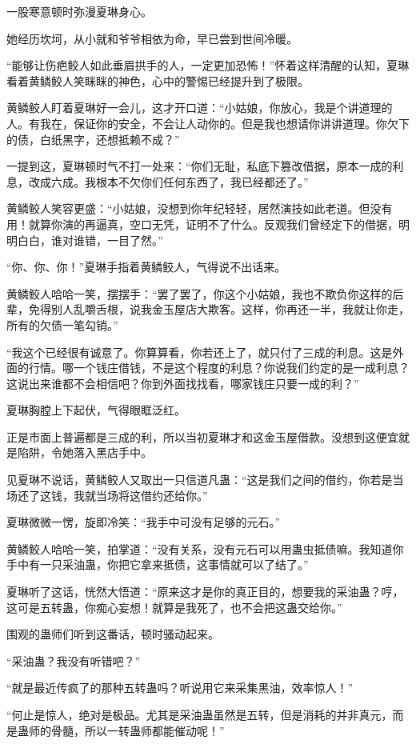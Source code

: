 \begin{this_body}
一股寒意顿时弥漫夏琳身心。

她经历坎坷，从小就和爷爷相依为命，早已尝到世间冷暖。

“能够让伤疤鲛人如此垂眉拱手的人，一定更加恐怖！”怀着这样清醒的认知，夏琳看着黄鳞鲛人笑眯眯的神色，心中的警惕已经提升到了极限。

黄鳞鲛人盯着夏琳好一会儿，这才开口道：“小姑娘，你放心，我是个讲道理的人。有我在，保证你的安全，不会让人动你的。但是我也想请你讲讲道理。你欠下的债，白纸黑字，还想抵赖不成？”

一提到这，夏琳顿时气不打一处来：“你们无耻，私底下篡改借据，原本一成的利息，改成六成。我根本不欠你们任何东西了，我已经都还了。”

黄鳞鲛人笑容更盛：“小姑娘，没想到你年纪轻轻，居然演技如此老道。但没有用！就算你演的再逼真，空口无凭，证明不了什么。反观我们曾经定下的借据，明明白白，谁对谁错，一目了然。”

“你、你、你！”夏琳手指着黄鳞鲛人，气得说不出话来。

黄鳞鲛人哈哈一笑，摆摆手：“罢了罢了，你这个小姑娘，我也不欺负你这样的后辈，免得别人乱嚼舌根，说我金玉屋店大欺客。这样，你再还一半，我就让你走，所有的欠债一笔勾销。”

“我这个已经很有诚意了。你算算看，你若还上了，就只付了三成的利息。这是外面的行情。哪一个钱庄借钱，不是这个程度的利息？你说我们约定的是一成利息？这说出来谁都不会相信吧？你到外面找找看，哪家钱庄只要一成的利？”

夏琳胸膛上下起伏，气得眼眶泛红。

正是市面上普遍都是三成的利，所以当初夏琳才和这金玉屋借款。没想到这便宜就是陷阱，令她落入黑店手中。

见夏琳不说话，黄鳞鲛人又取出一只信道凡蛊：“这是我们之间的借约，你若是当场还了这钱，我就当场将这借约还给你。”

夏琳微微一愣，旋即冷笑：“我手中可没有足够的元石。”

黄鳞鲛人哈哈一笑，拍掌道：“没有关系，没有元石可以用蛊虫抵债嘛。我知道你手中有一只采油蛊，你把它拿来抵债，这事情就可以了结了。”

夏琳听了这话，恍然大悟道：“原来这才是你的真正目的，想要我的采油蛊？哼，这可是五转蛊，你痴心妄想！就算是我死了，也不会把这蛊交给你。”

围观的蛊师们听到这番话，顿时骚动起来。

“采油蛊？我没有听错吧？”

“就是最近传疯了的那种五转蛊吗？听说用它来采集黑油，效率惊人！”

“何止是惊人，绝对是极品。尤其是采油蛊虽然是五转，但是消耗的并非真元，而是蛊师的骨髓，所以一转蛊师都能催动呢！”


\end{this_body}
